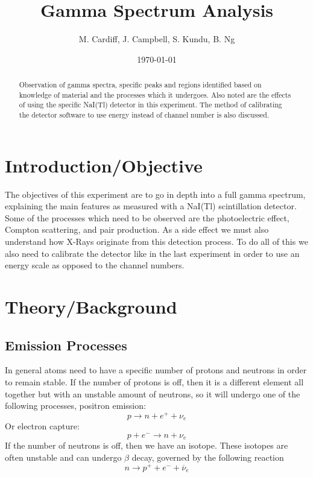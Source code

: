 \documentclass[letterpaper,12pt]{article}
\begin{document}
\title{Gamma Spectrum Analysis}
\author{M. Cardiff, J. Campbell, S. Kundu, B. Ng}
\date{\today}
\maketitle

\begin{abstract}
  Observation of gamma spectra, specific peaks and regions identified based on knowledge of material and the processes which it undergoes. Also noted are the effects of using the specific NaI(Tl) detector in this experiment. The method of calibrating the detector software to use energy instead of channel number is also discussed. 
\end{abstract}
\section{Introduction/Objective}
The objectives of this experiment are to go in depth into a full gamma spectrum, explaining the main features as measured with a NaI(Tl) scintillation detector. Some of the processes which need to be observed are the photoelectric effect, Compton scattering, and pair production. As a side effect we must also understand how X-Rays originate from this detection process. To do all of this we also need to calibrate the detector like in the last experiment in order to use an energy scale as opposed to the channel numbers.
\section{Theory/Background}

\subsection{Emission Processes}
In general atoms need to have a specific number of protons and neutrons in order to remain stable. If the number of protons is off, then it is a different element all together but with an unstable amount of neutrons, so it will undergo one of the following processes, positron emission:
\begin{equation}
  \label{eq:pe}
  p\to n+e^++\nu_e
\end{equation}
Or electron capture:
\begin{equation}
  \label{eq:ec}
  p+e^-\to n+\nu_e
\end{equation}
If the number of neutrons is off, then we have an isotope. These isotopes are often unstable and can undergo $\beta$ decay, governed by the following reaction
\begin{equation}
  \label{eq:beta}
  n\to p^++e^-+\overline{\nu}_e
\end{equation}
\end{document}
